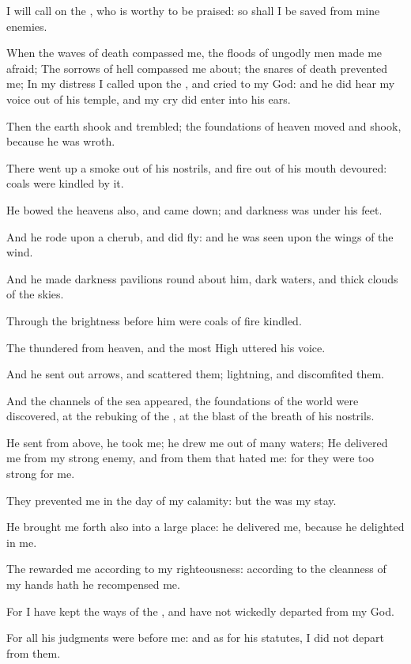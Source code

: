 \verse I will call on the \LORD, who is worthy to be praised: so shall I be saved from mine enemies.

\verse When the waves of death compassed me, the floods of ungodly men made me afraid; \verse The sorrows of hell compassed me about; the snares of death prevented me; \verse In my distress I called upon the \LORD, and cried to my God: and he did hear my voice out of his temple, and my cry did enter into his ears.

\verse Then the earth shook and trembled; the foundations of heaven moved and shook, because he was wroth.

\verse There went up a smoke out of his nostrils, and fire out of his mouth devoured: coals were kindled by it.

\verse He bowed the heavens also, and came down; and darkness was under his feet.

\verse And he rode upon a cherub, and did fly: and he was seen upon the wings of the wind.

\verse And he made darkness pavilions round about him, dark waters, and thick clouds of the skies.

\verse Through the brightness before him were coals of fire kindled.

\verse The \LORD thundered from heaven, and the most High uttered his voice.

\verse And he sent out arrows, and scattered them; lightning, and discomfited them.

\verse And the channels of the sea appeared, the foundations of the world were discovered, at the rebuking of the \LORD, at the blast of the breath of his nostrils.

\verse He sent from above, he took me; he drew me out of many waters; \verse He delivered me from my strong enemy, and from them that hated me: for they were too strong for me.

\verse They prevented me in the day of my calamity: but the \LORD was my stay.

\verse He brought me forth also into a large place: he delivered me, because he delighted in me.

\verse The \LORD rewarded me according to my righteousness: according to the cleanness of my hands hath he recompensed me.

\verse For I have kept the ways of the \LORD, and have not wickedly departed from my God.

\verse For all his judgments were before me: and as for his statutes, I did not depart from them.

